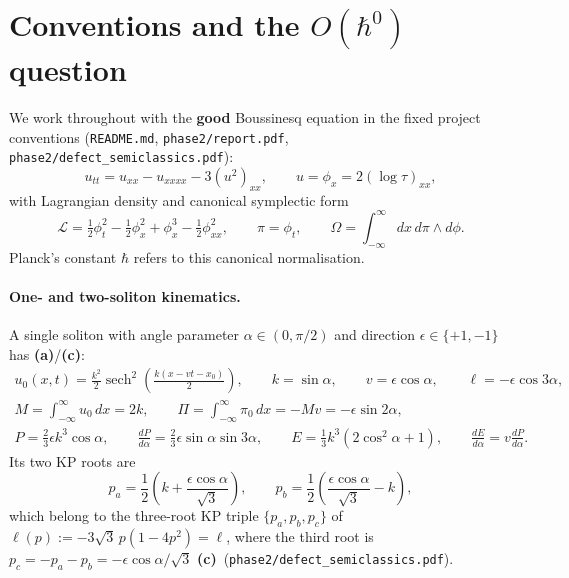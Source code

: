 \documentclass[11pt,a4paper]{article}
\newcommand{\La}{\textsf{\textbf{(a)}}}
\newcommand{\Lc}{\textsf{\textbf{(c)}}}
\theoremstyle{remark}
\begin{document}
\tableofcontents

\section{Conventions and the $O(\hbar^0)$ question}

We work throughout with the \textbf{good} Boussinesq equation in the fixed project conventions (\texttt{README.md}, \texttt{phase2/report.pdf}, \texttt{phase2/defect\_semiclassics.pdf}):
\begin{equation}\label{eq:good_bouss}
u_{tt}=u_{xx}-u_{xxxx}-3(u^2)_{xx},\qquad u=\phi_x=2(\log\tau)_{xx},
\end{equation}
with Lagrangian density and canonical symplectic form
\begin{equation}\label{eq:lagrangian}
\mathcal{L}=\tfrac12\phi_t^2-\tfrac12\phi_x^2+\phi_x^3-\tfrac12\phi_{xx}^2,\qquad
\pi=\phi_t,\qquad \Omega=\int_{-\infty}^\infty dx\,d\pi\wedge d\phi .
\end{equation}
Planck's constant $\hbar$ refers to this canonical normalisation.

\paragraph{One- and two-soliton kinematics.} A single soliton with angle parameter $\alpha\in(0,\pi/2)$ and direction $\epsilon\in\{+1,-1\}$ has \La/\Lc:
\begin{equation}\label{eq:onesol_data}
\begin{gathered}
u_0(x,t)=\frac{k^2}{2}\operatorname{sech}^2\!\left(\frac{k(x-vt-x_0)}{2}\right),\qquad
k=\sin\alpha,\qquad v=\epsilon\cos\alpha,\qquad \ell=-\epsilon\cos 3\alpha,\\
M=\int_{-\infty}^\infty u_0\,dx=2k,\qquad \Pi=\int_{-\infty}^\infty\pi_0\,dx=-Mv=-\epsilon\sin 2\alpha,\\
P=\tfrac23\epsilon k^3\cos\alpha,\qquad \frac{dP}{d\alpha}=\tfrac23\epsilon\sin\alpha\sin 3\alpha,\qquad
E=\tfrac13 k^3(2\cos^2\alpha+1),\qquad \frac{dE}{d\alpha}=v\frac{dP}{d\alpha}.
\end{gathered}
\end{equation}
Its two KP roots are
\begin{equation}\label{eq:kp_roots}
p_a=\frac{1}{2}\left(k+\frac{\epsilon\cos\alpha}{\sqrt{3}}\right),\qquad
p_b=\frac{1}{2}\left(\frac{\epsilon\cos\alpha}{\sqrt{3}}-k\right),
\end{equation}
which belong to the three-root KP triple $\{p_a,p_b,p_c\}$ of $\ell(p):=-3\sqrt{3}\,p(1-4p^2)=\ell$, where the third root is $p_c=-p_a-p_b=-\epsilon\cos\alpha/\sqrt{3}$ \Lc\ (\texttt{phase2/defect\_semiclassics.pdf}).
\end{document}
